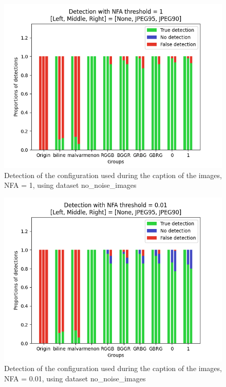 \documentclass[sigconf, nonacm]{acmart}
\begin{document}
\begin{figure}[p]
    \centering
    \includegraphics[width=0.87\columnwidth]{figures/config_detection_nfa_1.png}
    \caption{Detection of the configuration used during the caption of the images, NFA = 1, using dataset no\_noise\_images \cite{colom_noise_2023}}
    \label{fig:config_10-0}
\end{figure}

\begin{figure}[p]
    \centering
    \includegraphics[width=0.87\columnwidth]{figures/config_detection_nfa_0.01.png}
    \caption{Detection of the configuration used during the caption of the images, NFA = 0.01, using dataset no\_noise\_images \cite{colom_noise_2023}}
    \label{fig:config_10-2}
\end{figure}
\end{document}

